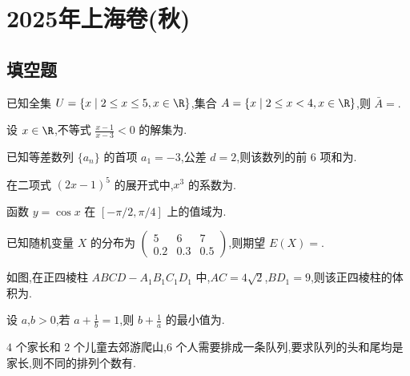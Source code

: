 \chapter{2025年上海卷(秋)}

\section{填空题}

\begin{problem}
已知全集 \(U = \{x \mid 2 \le x \le 5, x \in \R\}\),集合 \(A = \{x \mid 2 \le x < 4, x \in \R\}\),则 \(\bar{A} =\)\fillinblank{}.
\end{problem}

\begin{problem}
设 \(x\in\R\),不等式 \(\frac{x-1}{x-3}<0\) 的解集为\fillinblank{}.
\end{problem}

\begin{problem}
已知等差数列 \(\{a_n\}\) 的首项 \(a_1 = -3\),公差 \(d = 2\),则该数列的前 \(6\) 项和为\fillinblank{}.
\end{problem}

\begin{problem}
在二项式 \((2x-1)^5\) 的展开式中,\(x^3\) 的系数为\fillinblank{}.
\end{problem}

\begin{problem}
函数 \(y=\cos x\) 在 \([-\pi/2,\pi/4]\) 上的值域为\fillinblank{}.
\end{problem}

\begin{problem}
已知随机变量 \(X\) 的分布为
\(\begin{pmatrix}5&6&7\\0.2&0.3&0.5\end{pmatrix}\),则期望 \(E(X)=\)\fillinblank{}.
\end{problem}

\begin{problem}
如图,在正四棱柱 \(ABCD-A_1B_1C_1D_1\) 中,\(AC=4\sqrt2\),\(BD_1=9\),则该正四棱柱的体积为\fillinblank{}.

\end{problem}

\begin{problem}
设 \(a\),\(b>0\),若 \(a+\frac1b=1\),则 \(b+\frac1a\) 的最小值为\fillinblank{}.
\end{problem}

\begin{problem}
\(4\) 个家长和 \(2\) 个儿童去郊游爬山,\(6\) 个人需要排成一条队列,要求队列的头和尾均是家长,则不同的排列个数有\fillinblank{}.
\end{problem}

